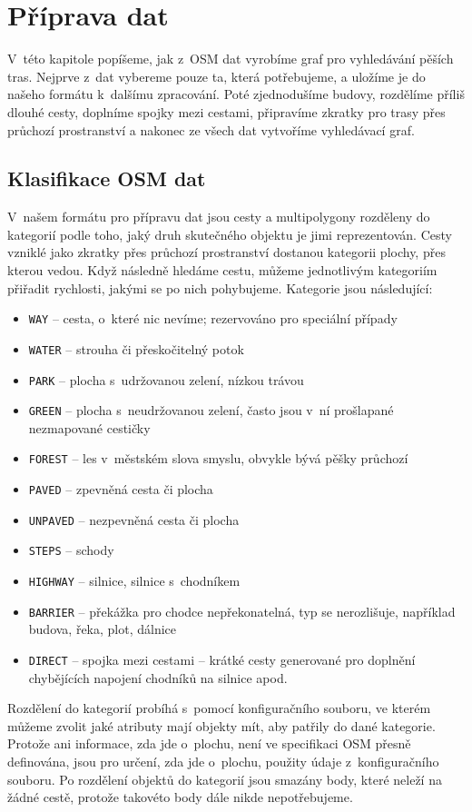 \chapter{Příprava dat}
V~této kapitole popíšeme, jak z~OSM dat vyrobíme graf pro vyhledávání pěších
tras. Nejprve z~dat vybereme pouze ta, která potřebujeme, a uložíme je do
našeho formátu k~dalšímu zpracování. Poté zjednodušíme budovy, rozdělíme příliš
dlouhé cesty, doplníme spojky mezi cestami, připravíme zkratky pro trasy přes
průchozí prostranství a nakonec ze všech dat vytvoříme vyhledávací graf.

\section{Klasifikace OSM dat} \label{label:kategorie}
V~našem formátu pro přípravu dat jsou cesty a multipolygony rozděleny do
kategorií podle toho, jaký druh skutečného objektu je jimi reprezentován. Cesty vzniklé
jako zkratky přes průchozí prostranství dostanou kategorii plochy, přes kterou
vedou. Když následně hledáme cestu, můžeme jednotlivým kategoriím přiřadit
rychlosti, jakými se po nich pohybujeme. Kategorie jsou následující:
\begin{itemize}
	\item \verb|WAY| -- cesta, o~které nic nevíme; rezervováno pro speciální
	případy
	\item \verb|WATER| -- strouha či přeskočitelný potok
	\item \verb|PARK| -- plocha s~udržovanou zelení, nízkou trávou
	\item \verb|GREEN| -- plocha s~neudržovanou zelení, často jsou v~ní
	prošlapané nezmapované cestičky
	\item \verb|FOREST| -- les v~městském slova smyslu, obvykle bývá pěšky
	průchozí
	\item \verb|PAVED| -- zpevněná cesta či plocha
	\item \verb|UNPAVED| -- nezpevněná cesta či plocha
	\item \verb|STEPS| -- schody
	\item \verb|HIGHWAY| -- silnice, silnice s~chodníkem
	\item \verb|BARRIER| -- překážka pro chodce nepřekonatelná, typ se
	nerozlišuje, například budova, řeka, plot, dálnice
	\item \verb|DIRECT| -- spojka mezi cestami -- krátké cesty generované
	pro doplnění chybějících napojení chodníků na silnice apod.
\end{itemize}
Rozdělení do kategorií probíhá s~pomocí konfiguračního souboru, ve kterém můžeme
zvolit jaké atributy mají objekty mít, aby patřily do dané kategorie. Protože
ani informace, zda jde o~plochu, není ve specifikaci OSM přesně definována, jsou
pro určení, zda jde o~plochu, použity údaje z~konfiguračního souboru. Po
rozdělení objektů do kategorií jsou smazány body, které neleží na žádné cestě,
protože takovéto body dále nikde nepotřebujeme.

